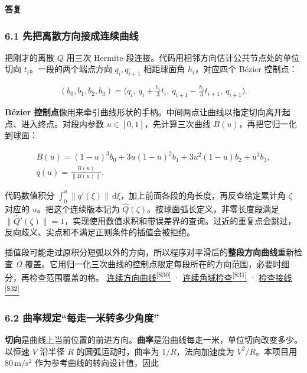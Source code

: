 \documentclass[11pt,a4paper]{article}
\numberwithin{equation}{topic}
\newenvironment{reply}{%
  \par\noindent\textcolor{replycolor}{\sffamily\bfseries 答复}\par\nobreak\ignorespaces
}{\par\medskip}
\newcommand{\sourceref}[2]{\hyperlink{source-#1}{#2\textsuperscript{[#1]}}}
\begin{document}
\begin{reply}
\subsubsection*{6.1 先把离散方向接成连续曲线}

把刚才的离散 \(Q\) 用三次 Hermite 段连接。代码用相邻方向估计公共节点处的单位切向 \(t_i\)。一段的两个端点方向 \(q_i,q_{i+1}\) 相距球面角 \(h_i\)，对应四个 Bézier 控制点：

\begin{equation}
\label{eq:control-points}
(b_0,b_1,b_2,b_3)=
\bigl(q_i,\ q_i+\tfrac{h_i}{3}t_i,\
q_{i+1}-\tfrac{h_i}{3}t_{i+1},\ q_{i+1}\bigr).
\end{equation}

\textbf{Bézier 控制点}像用来牵引曲线形状的手柄。中间两点让曲线以指定切向离开起点、进入终点。对段内参数 \(u\in[0,1]\)，先计算三次曲线 \(B(u)\)，再把它归一化到球面：

\begin{equation}
\label{eq:normalize}
\begin{gathered}
B(u)=(1-u)^3 b_0+3u(1-u)^2b_1+3u^2(1-u)b_2+u^3b_3,
\\
q(u)=\frac{B(u)}{\|B(u)\|}.
\end{gathered}
\end{equation}

代码数值积分 \(\int_0^u\|q'(\xi)\|\,\mathrm d\xi\)，加上前面各段的角长度，再反查给定累计角 \(\zeta\) 对应的 \(u\)。把这个连续版本记为 \(\widehat Q(\zeta)\)。按球面弧长定义，非零长度段满足 \(\|\widehat Q'(\zeta)\|=1\)，实现使用数值求积和带误差界的查询。过近的重复点会跳过，反向歧义、尖点和不满足正则条件的插值会被拒绝。

插值段可能走过原积分短弧以外的方向，所以程序对平滑后的\textbf{整段方向曲线}重新检查 \(\Omega\) 覆盖。它用归一化三次曲线的控制点限定每段所在的方向范围，必要时细分，再检查范围覆盖的格。 \sourceref{S30}{连续方向曲线} · \sourceref{S31}{连续角域检查} · \sourceref{S32}{检查接线}

\subsubsection*{6.2 曲率规定“每走一米转多少角度”}

\textbf{切向}是曲线上当前位置的前进方向。\textbf{曲率}是沿曲线每走一米，单位切向改变多少。以恒速 \(V\) 沿半径 \(R\) 的圆弧运动时，曲率为 \(1/R\)，法向加速度为 \(V^2/R\)。本项目用 \(80\,\mathrm{m/s^2}\) 作为参考曲线的转向设计值，因此


\end{reply}
\end{document}

